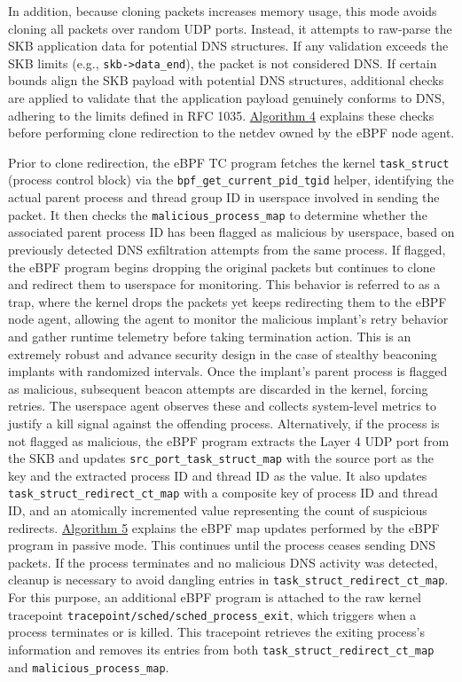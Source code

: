 \documentclass [11pt, proquest] {uwthesis}[2020/02/24]
\begin{document}
In addition, because cloning packets increases memory usage, this mode avoids cloning all packets over random UDP ports. Instead, it attempts to raw-parse the SKB application data for potential DNS structures. If any validation exceeds the SKB limits (e.g., \texttt{skb->data\_end}), the packet is not considered DNS. If certain bounds align the SKB payload with potential DNS structures, additional checks are applied to validate that the application payload genuinely conforms to DNS, adhering to the limits defined in RFC 1035. \hyperref[sec:alg4]{Algorithm 4} explains these checks before performing clone redirection to the netdev owned by the eBPF node agent.

Prior to clone redirection, the eBPF TC program fetches the kernel \texttt{task\_struct} (process control block) via the \texttt{bpf\_get\_current\_pid\_tgid} helper, identifying the actual parent process and thread group ID in userspace involved in sending the packet. It then checks the \texttt{malicious\_process\_map} to determine whether the associated parent process ID has been flagged as malicious by userspace, based on previously detected DNS exfiltration attempts from the same process. If flagged, the eBPF program begins dropping the original packets but continues to clone and redirect them to userspace for monitoring. This behavior is referred to as a trap, where the kernel drops the packets yet keeps redirecting them to the eBPF node agent, allowing the agent to monitor the malicious implant’s retry behavior and gather runtime telemetry before taking termination action. This is an extremely robust and advance security design in the case of stealthy beaconing implants with randomized intervals. Once the implant’s parent process is flagged as malicious, subsequent beacon attempts are discarded in the kernel, forcing retries. The userspace agent observes these and collects system-level metrics to justify a kill signal against the offending process. Alternatively, if the process is not flagged as malicious, the eBPF program extracts the Layer 4 UDP port from the SKB and updates \texttt{src\_port\_task\_struct\_map} with the source port as the key and the extracted process ID and thread ID as the value. It also updates \texttt{task\_struct\_redirect\_ct\_map} with a composite key of process ID and thread ID, and an atomically incremented value representing the count of suspicious redirects. \hyperref[sec:alg5]{Algorithm 5} explains the eBPF map updates performed by the eBPF program in passive mode.
This continues until the process ceases sending DNS packets. If the process terminates and no malicious DNS activity was detected, cleanup is necessary to avoid dangling entries in \texttt{task\_struct\_redirect\_ct\_map}. For this purpose, an additional eBPF program is attached to the raw kernel tracepoint \texttt{tracepoint/sched/sched\_process\_exit}, which triggers when a process terminates or is killed. This tracepoint retrieves the exiting process’s information and removes its entries from both \texttt{task\_struct\_redirect\_ct\_map} and \texttt{malicious\_process\_map}.
\end{document}
